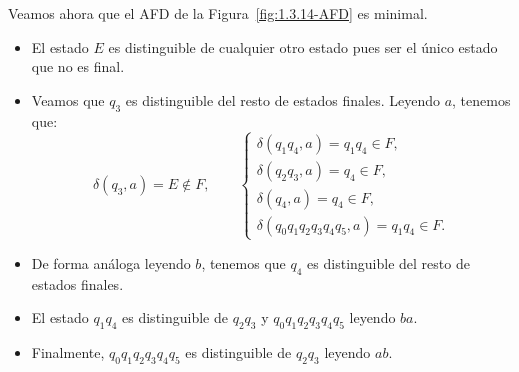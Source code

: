 \begin{ejercicio}
    Veamos ahora que el AFD de la Figura~\ref{fig:1.3.14-AFD} es minimal.
    \begin{itemize}
        \item El estado $E$ es distinguible de cualquier otro estado pues ser el único estado que no es final.
        \item Veamos que $q_3$ es distinguible del resto de estados finales. Leyendo $a$, tenemos que:
        \begin{equation*}
            \delta(q_3,a)=E\notin F,\qquad \left\{\begin{array}{l}
                \delta(q_1q_4,a)=q_1q_4\in F,\\
                \delta(q_2q_3,a)=q_4\in F,\\
                \delta(q_4,a)=q_4\in F,\\
                \delta(q_0q_1q_2q_3q_4q_5,a)=q_1q_4\in F.
            \end{array}
            \right.
        \end{equation*}
        \item De forma análoga leyendo $b$, tenemos que $q_4$ es distinguible del resto de estados finales.
        \item El estado $q_1q_4$ es distinguible de $q_2q_3$ y $q_0q_1q_2q_3q_4q_5$ leyendo $ba$.
        \item Finalmente, $q_0q_1q_2q_3q_4q_5$ es distinguible de $q_2q_3$ leyendo $ab$.
    \end{itemize}
\end{ejercicio}

